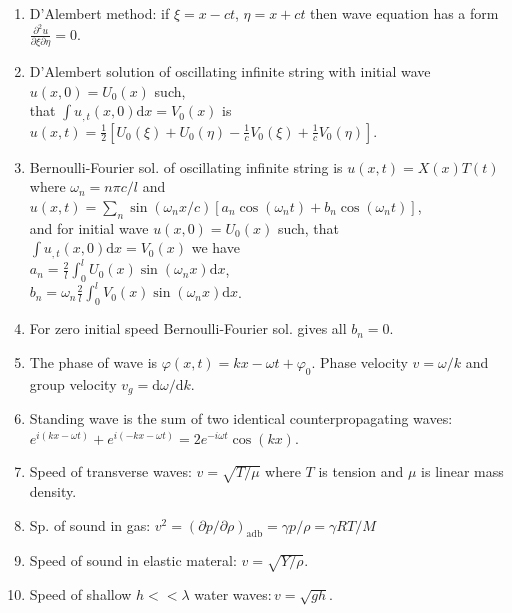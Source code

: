 \documentclass{article}
\renewcommand\d{\mathrm d}
\begin{document}
\begin{multicols}{3}
\begin{enumerate}
        \item D'Alembert method: if $\xi=x-ct$, $\eta=x+ct$ then wave equation has a form $\frac{\partial^2 u}{\partial\xi\partial\eta}=0$.
        \item D'Alembert solution of oscillating infinite string with initial wave $u(x,0)=U_0(x)$ such,\\ that $\int u_{,t}(x,0)\d x=V_0(x)$ is\\ $u(x,t)=\frac{1}{2}\left[U_0(\xi)+U_0(\eta)-\frac{1}{c}V_0(\xi)+\frac{1}{c}V_0(\eta)\right]$.
        \item Bernoulli-Fourier sol. of oscillating infinite string is $u(x,t)=X(x)T(t)$ where $\omega_n=n\pi c/l$ and\\
            $u(x,t)=\sum_n\sin(\omega_nx/c)\left[a_n\cos(\omega_nt)+b_n\cos(\omega_nt)\right]$,\\
            and for initial wave $u(x,0)=U_0(x)$ such, that\\ $\int u_{,t}(x,0)\d x=V_0(x)$ we have\\ $a_n=\frac{2}{l}\int_0^lU_0(x)\sin(\omega_nx)\d x$,\\ $b_n=\omega_n\frac{2}{l}\int_0^lV_0(x)\sin(\omega_nx)\d x$.
        \item For zero initial speed Bernoulli-Fourier sol. gives all $b_n=0$.
        \item The phase of wave is $\varphi(x,t)=kx-\omega t+\varphi_0$. Phase velocity $v=\omega/k$ and group velocity $v_g=\d\omega/\d k$.
        \item Standing wave is the sum of two identical counterpropagating waves: $e^{i(kx-\omega t)}+e^{i(-kx-\omega t)}=2e^{-i\omega t}\cos(kx)$.
        \item Speed of transverse waves: $v=\sqrt{T/\mu}$ where $T$ is tension and $\mu$ is linear mass density.
        \item Sp. of sound in gas: $v^2=(\partial p/\partial\rho)_{\text{adb}}=\gamma p/\rho=\gamma R T/M$
        \item Speed of sound in elastic materal: $v=\sqrt{Y/\rho}$.
        \item Speed of shallow $h <<\lambda$ water waves:$\,v=\sqrt{gh}$.
    \end{enumerate}


\end{multicols}
\end{document}
